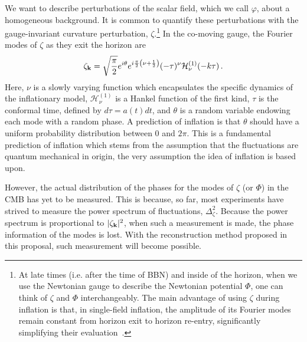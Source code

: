 \documentclass[psfig,11pt]{article}
\def\be{\begin{equation}}
\def\ee{\end{equation}}
\begin{document}
We want to describe perturbations of the scalar field, which we call $\varphi$, about a homogeneous background. It is common to quantify these perturbations with the gauge-invariant curvature perturbation, $\zeta$.\footnote{At late times (i.e. after the time of BBN) and inside of the horizon, when we use the Newtonian gauge to describe the Newtonian potential $\Phi$, one can think of $\zeta$ and $\Phi$ interchangeably. The main advantage of using $\zeta$ during inflation is that, in single-field inflation, the amplitude of its Fourier modes remain constant from horizon exit to horizon re-entry, significantly simplifying their evaluation~\cite{Weinberg2008}.}
 In the co-moving gauge, the Fourier modes of $\zeta$ as they exit the horizon are
\be
	\zeta_{{\bf k}}=\sqrt{\frac{\pi}{2}}e^{i\theta}e^{i\frac{\pi}{2}\left(\nu+\frac{1}{2}\right)}(-\tau)^{\nu}\mathcal{H}^{(1)}_\nu(-k\tau)\, .
\ee
Here, $\nu$ is a slowly varying function which encapsulates the specific dynamics of the inflationary model, $\mathcal{H}^{(1)}_\nu$ is a Hankel function of the first kind, $\tau$ is the conformal time, defined by $d\tau=a(t)dt$, and $\theta$ is a random variable endowing each mode with a random phase. A prediction of inflation is that $\theta$ should have a uniform probability distribution between 0 and $2\pi$. This is a fundamental prediction of inflation which stems from the assumption that the fluctuations are quantum mechanical in origin, the very assumption the idea of inflation is based upon.

However, the actual distribution of the phases for the modes of $\zeta$ (or $\Phi$) in the CMB has yet to be measured. This is because, so far, most experiments have strived to measure the power spectrum of fluctuations, $\Delta_\zeta^2$. %
Because the power spectrum is proportional to $ |\zeta_{{\bf k}}|^2$, when such a measurement is made, the phase information of the modes is lost. With the reconstruction method proposed in this proposal, such measurement will become possible.
\end{document}
